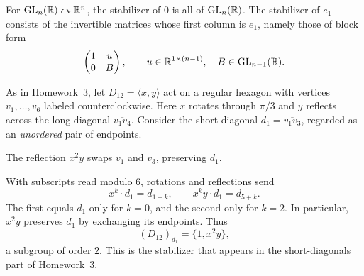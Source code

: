 \documentclass[reqno,11pt]{amsart}
\begin{document}
\begin{example}
For $\operatorname{GL}_n(\mathbb{R})\curvearrowright\mathbb{R}^n$, the stabilizer of $0$ is
all of $\operatorname{GL}_n(\mathbb{R})$. The stabilizer of $e_1$ consists of the
invertible matrices whose first column is $e_1$, namely those of
block form
\[
  \begin{pmatrix}1&u\\0&B\end{pmatrix},
  \qquad u\in\mathbb{R}^{1\times(n-1)},\quad B\in\operatorname{GL}_{n-1}(\mathbb{R}).
\]
\end{example}



\begin{example}\label{ex:short-diagonal-stabilizer}
As in Homework~3, let $D_{12}=\langle x,y\rangle$ act on a regular
hexagon with vertices $v_1,\ldots,v_6$ labeled counterclockwise.
Here $x$ rotates through $\pi/3$ and $y$ reflects across the long
diagonal $\overline{v_1v_4}$. Consider the short diagonal
$d_1=\overline{v_1v_3}$, regarded as an \emph{unordered} pair of
endpoints.

\begin{center}

{\small The reflection $x^2y$ swaps $v_1$ and $v_3$, preserving $d_1$.}
\end{center}

With subscripts read modulo $6$, rotations and reflections send
\[
  x^k\cdot d_1=d_{1+k},\qquad
  x^ky\cdot d_1=d_{5+k}.
\]
The first equals $d_1$ only for $k=0$, and the second only for
$k=2$. In particular, $x^2y$ preserves $d_1$ by exchanging its
endpoints. Thus
\[
  (D_{12})_{d_1}=\{1,x^2y\},
\]
a subgroup of order $2$. This is the stabilizer that appears in the
short-diagonals part of Homework~3.
\end{example}
\end{document}
